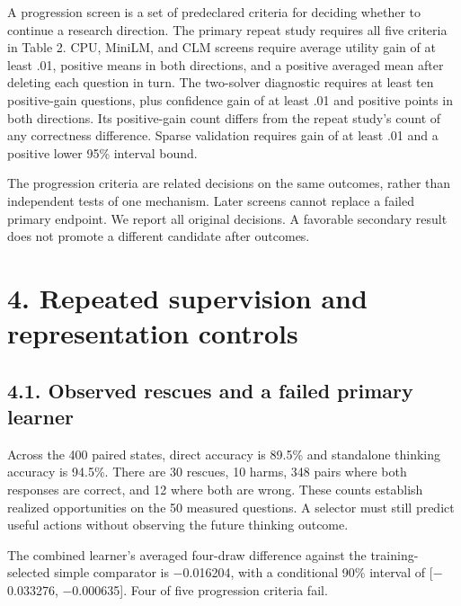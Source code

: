 \documentclass[11pt,a4paper]{article}
\begin{document}
A progression screen is a set of predeclared criteria for deciding whether to continue a research direction. The primary repeat study requires all five criteria in Table 2. CPU, MiniLM, and CLM screens require average utility gain of at least .01, positive means in both directions, and a positive averaged mean after deleting each question in turn. The two-solver diagnostic requires at least ten positive-gain questions, plus confidence gain of at least .01 and positive points in both directions. Its positive-gain count differs from the repeat study's count of any correctness difference. Sparse validation requires gain of at least .01 and a positive lower 95\% interval bound.

The progression criteria are related decisions on the same outcomes, rather than independent tests of one mechanism. Later screens cannot replace a failed primary endpoint. We report all original decisions. A favorable secondary result does not promote a different candidate after outcomes.

\section*{4. Repeated supervision and representation controls}\label{sec:4-repeated-supervision-and-representation-controls}
\subsection*{4.1. Observed rescues and a failed primary learner}\label{sec:41-observed-rescues-and-a-failed-primary-learner}
Across the 400 paired states, direct accuracy is 89.5\% and standalone thinking accuracy is 94.5\%. There are 30 rescues, 10 harms, 348 pairs where both responses are correct, and 12 where both are wrong. These counts establish realized opportunities on the 50 measured questions. A selector must still predict useful actions without observing the future thinking outcome.

The combined learner's averaged four-draw difference against the training-selected simple comparator is \ensuremath{-}0.016204, with a conditional 90\% interval of [\ensuremath{-}0.033276, \ensuremath{-}0.000635]. Four of five progression criteria fail.
\end{document}
